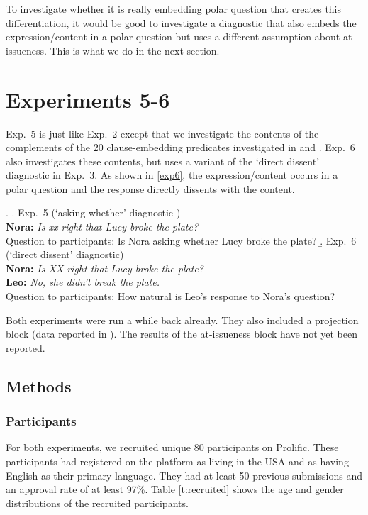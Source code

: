 \documentclass[times,linguex,xcolor]{glossa}
\begin{document}
 To investigate whether it is really embedding polar question that creates this differentiation, it would be good to investigate a diagnostic that also embeds the expression/content in a polar question but uses a different assumption about at-issueness. This is what we do in the next section.
      
\section{Experiments 5-6}

Exp.~5 is just like Exp.~2 except that we investigate the contents of the complements of the 20 clause-embedding predicates investigated in \citealt{tonhauser_how_2018} and \citealt{degen-tonhauser-glossa}. Exp.~6 also investigates these contents, but uses a variant of the `direct dissent' diagnostic in Exp.~3. As shown in \ref{exp6}, the expression/content occurs in a polar question and the response directly dissents with the content. 

\ex.
\a.\label{exp5} Exp.~5 (`asking whether' diagnostic )
\\ {\bf Nora:} \emph{Is xx right that Lucy broke the plate?}
\\ Question to participants: Is Nora asking whether Lucy broke the plate?
\b.\label{exp6} Exp.~6 (`direct dissent' diagnostic)
\\ {\bf Nora:} \emph{Is XX right that Lucy broke the plate?}
\\ {\bf Leo:} \emph{No, she didn't break the plate.}
\\ Question to participants: How natural is Leo's response to Nora's question?

Both experiments were run a while back already. They also included a projection block (data reported in \citealt{hofmann-etal2024}). The results of the at-issueness block have not yet been reported.

\subsection{Methods}

\subsubsection{Participants}

For both experiments, we recruited unique 80 participants on Prolific. These participants had registered on the platform as living in the USA and as having English as their primary language. They had at least 50 previous submissions and an approval rate of at least 97\%.  Table \ref{t:recruited} shows the age and gender distributions of the recruited participants.
\end{document}
